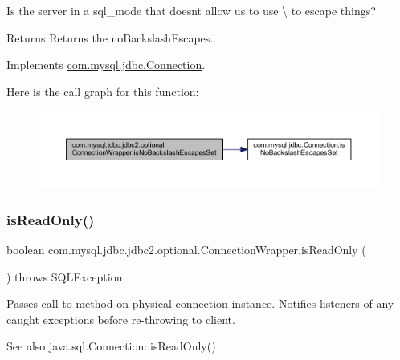 Is the server in a sql\+\_\+mode that doesn\textquotesingle{}t allow us to use \textbackslash{} to escape things?

\begin{DoxyReturn}{Returns}
Returns the no\+Backslash\+Escapes. 
\end{DoxyReturn}


Implements \mbox{\hyperlink{interfacecom_1_1mysql_1_1jdbc_1_1_connection_a3465592f69365c9572cc404ae04375b4}{com.\+mysql.\+jdbc.\+Connection}}.

Here is the call graph for this function\+:
\nopagebreak
\begin{figure}[H]
\begin{center}
\leavevmode
\includegraphics[width=350pt]{classcom_1_1mysql_1_1jdbc_1_1jdbc2_1_1optional_1_1_connection_wrapper_a75f9e3be6db60cb253060986aac46e4c_cgraph}
\end{center}
\end{figure}
\mbox{\label{classcom_1_1mysql_1_1jdbc_1_1jdbc2_1_1optional_1_1_connection_wrapper_a528d8fe8af6e92819391455e0e8e68ac}} 
\subsubsection{\texorpdfstring{is\+Read\+Only()}{isReadOnly()}}
{\footnotesize\ttfamily boolean com.\+mysql.\+jdbc.\+jdbc2.\+optional.\+Connection\+Wrapper.\+is\+Read\+Only (\begin{DoxyParamCaption}{ }\end{DoxyParamCaption}) throws S\+Q\+L\+Exception}

Passes call to method on physical connection instance. Notifies listeners of any caught exceptions before re-\/throwing to client.

\begin{DoxySeeAlso}{See also}
java.\+sql.\+Connection\+::is\+Read\+Only() 
\end{DoxySeeAlso}
\mbox{\label{classcom_1_1mysql_1_1jdbc_1_1jdbc2_1_1optional_1_1_connection_wrapper_a7361ebd235ec5eb1608231e3b9d4eb36}} 

